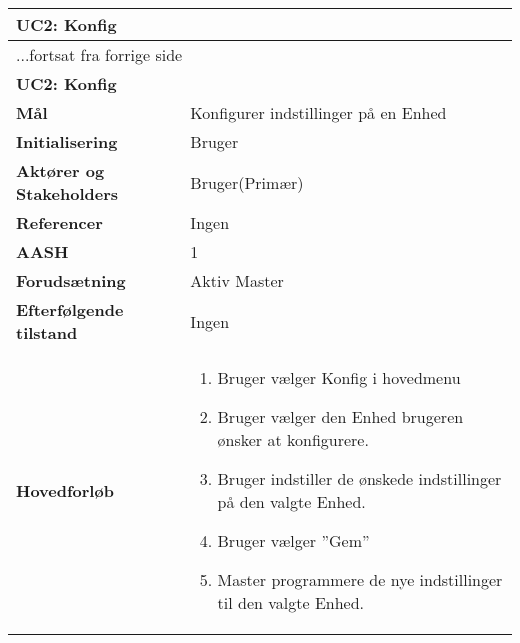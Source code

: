 \begin{center} \centering \label{UC2}
	\begin{longtable}{|p{5cm}|p{9cm}|}  %
	\hline
		\multicolumn{2}{|l|}{\textbf{UC2: Konfig}} \\\hline %
		\endfirsthead
		
		\multicolumn{2}{l}{...fortsat fra forrige side} \\ \hline %
		\multicolumn{2}{|l|}{\textbf{UC2: Konfig}} \\\hline %
		\endhead	
		
		\textbf{Mål}								&Konfigurer indstillinger på en Enhed			\\\hline
		\textbf{Initialisering}					&Bruger							\\\hline
		\textbf{Aktører og Stakeholders}			&Bruger(Primær)					\\\hline
		\textbf{Referencer}						&Ingen							\\\hline
		\textbf{AASH}							&1								\\\hline
		\textbf{Forudsætning}					&Aktiv Master					\\\hline
		\textbf{Efterfølgende tilstand}			&Ingen							\\\hline
		\textbf{Hovedforløb}					
			&\begin{enumerate}
	
				\item Bruger vælger Konfig i hovedmenu
				
				\item Bruger vælger den Enhed brugeren ønsker at konfigurere.
				
				\item Bruger indstiller de ønskede indstillinger på den valgte Enhed.
				
				\item Bruger vælger ''Gem''
				
				\item Master programmere de nye indstillinger til den valgte Enhed. 
	
			\end{enumerate}\\\hline
	\end{longtable}
\end{center}

